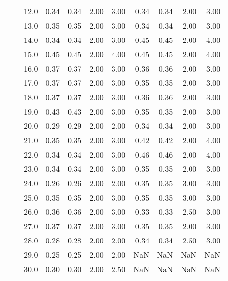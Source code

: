 \begin{tabular}{lllrrrrrrrr}
   &     & 12.0 &       0.34 &      0.34 & 2.00 &   3.00 &       0.34 &      0.34 & 2.00 &   3.00 \\
   &     & 13.0 &       0.35 &      0.35 & 2.00 &   3.00 &       0.34 &      0.34 & 2.00 &   3.00 \\
   &     & 14.0 &       0.34 &      0.34 & 2.00 &   3.00 &       0.45 &      0.45 & 2.00 &   4.00 \\
   &     & 15.0 &       0.45 &      0.45 & 2.00 &   4.00 &       0.45 &      0.45 & 2.00 &   4.00 \\
   &     & 16.0 &       0.37 &      0.37 & 2.00 &   3.00 &       0.36 &      0.36 & 2.00 &   3.00 \\
   &     & 17.0 &       0.37 &      0.37 & 2.00 &   3.00 &       0.35 &      0.35 & 2.00 &   3.00 \\
   &     & 18.0 &       0.37 &      0.37 & 2.00 &   3.00 &       0.36 &      0.36 & 2.00 &   3.00 \\
   &     & 19.0 &       0.43 &      0.43 & 2.00 &   3.00 &       0.35 &      0.35 & 2.00 &   3.00 \\
   &     & 20.0 &       0.29 &      0.29 & 2.00 &   2.00 &       0.34 &      0.34 & 2.00 &   3.00 \\
   &     & 21.0 &       0.35 &      0.35 & 2.00 &   3.00 &       0.42 &      0.42 & 2.00 &   4.00 \\
   &     & 22.0 &       0.34 &      0.34 & 2.00 &   3.00 &       0.46 &      0.46 & 2.00 &   4.00 \\
   &     & 23.0 &       0.34 &      0.34 & 2.00 &   3.00 &       0.35 &      0.35 & 2.00 &   3.00 \\
   &     & 24.0 &       0.26 &      0.26 & 2.00 &   2.00 &       0.35 &      0.35 & 3.00 &   3.00 \\
   &     & 25.0 &       0.35 &      0.35 & 2.00 &   3.00 &       0.35 &      0.35 & 3.00 &   3.00 \\
   &     & 26.0 &       0.36 &      0.36 & 2.00 &   3.00 &       0.33 &      0.33 & 2.50 &   3.00 \\
   &     & 27.0 &       0.37 &      0.37 & 2.00 &   3.00 &       0.35 &      0.35 & 2.00 &   3.00 \\
   &     & 28.0 &       0.28 &      0.28 & 2.00 &   2.00 &       0.34 &      0.34 & 2.50 &   3.00 \\
   &     & 29.0 &       0.25 &      0.25 & 2.00 &   2.00 &        NaN &       NaN &  NaN &    NaN \\
   &     & 30.0 &       0.30 &      0.30 & 2.00 &   2.50 &        NaN &       NaN &  NaN &    NaN \\

\end{tabular}
